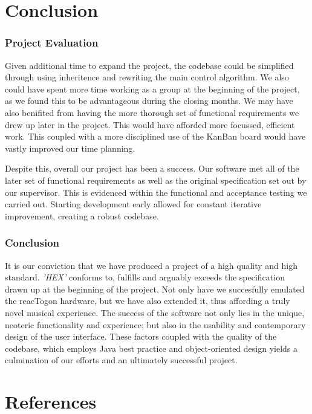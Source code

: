 \documentclass[10pt,a4paper]{article}
\begin{document}
\pagebreak
\part{Conclusion}
\section{Project Evaluation}
Given additional time to expand the project, the codebase could be simplified through using inheritence and rewriting the main control algorithm. We also could have spent more time working as a group at the beginning of the project, as we found this to be advantageous during the closing months. We may have also benifited from having the more thorough set of functional requirements we drew up later in the project. This would have afforded more focussed, efficient work. This coupled with a more disciplined use of the KanBan board would have vastly improved our time planning.

Despite this, overall our project has been a success. Our software met all of the later set of functional requirements as well as the original specification set out by our supervisor. This is evidenced within the functional and acceptance testing we carried out. Starting development early allowed for constant iterative improvement, creating a robust codebase.

\section{Conclusion}
It is our conviction that we have produced a project of a high quality and high standard. \textit{'HEX'} conforms to, fulfills and arguably exceeds the specification drawn up at the beginning of the project. Not only have we succesfully emulated the reacTogon hardware, but we have also extended it, thus affording a truly novel musical experience. The success of the software not only lies in the unique, neoteric functionality and experience; but also in the usability and contemporary design of the user interface. These factors coupled with the quality of the codebase, which employs Java best practice and object-oriented design yields a culmination of our efforts and an ultimately successful project.

\pagebreak
\part{References}


\pagebreak
\end{document}
